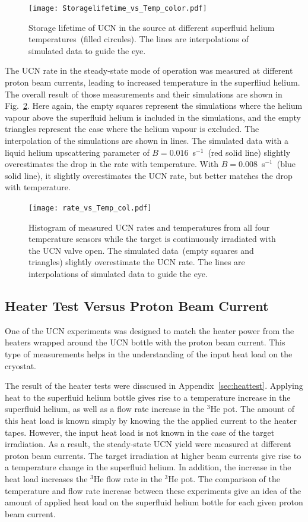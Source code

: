 \begin{figure}[h!]
  \centering
  \texttt{[image: Storagelifetime\_vs\_Temp\_color.pdf]}
  \caption{Storage lifetime of UCN in the source at different
    superfluid helium temperatures~(filled circules). The lines are
    interpolations of simulated data to guide the eye.}
  \label{fig:storage_vs_temp_sim}
\end{figure}

The UCN rate in the steady-state mode of operation was measured at
different proton beam currents, leading to increased temperature in
the superfliud helium. The overall result of those measurements and
their simulations are shown in Fig.~\ref{fig:rate_vs_temp_sim}. Here
again, the empty squares represent the simulations where the helium
vapour above the superfluid helium is included in the simulations, and
the empty triangles represent the case where the helium vapour is
excluded. The interpolation of the simulations are shown in lines. The
simulated data with a liquid helium upscattering parameter of
$B= 0.016$~s$^{-1}$~(red solid line) slightly overestimates the drop
in the rate with temperature. With $B= 0.008$~s$^{-1}$~(blue solid
line), it slightly overestimates the UCN rate, but better matches the
drop with temperature.


\begin{figure}[h!]
  \centering
  \texttt{[image: rate\_vs\_Temp\_col.pdf]}
  \caption{Histogram of measured UCN rates and temperatures from all
    four temperature sensors while the target is continuously
    irradiated with the UCN valve open. The simulated data~(empty
    squares and triangles) slightly overestimate the UCN rate. The
    lines are interpolations of simulated data to guide the eye.}
  \label{fig:rate_vs_temp_sim}
\end{figure}


\subsection{Heater Test Versus Proton Beam Current}
One of the UCN experiments was designed to match the heater power from
the heaters wrapped around the UCN bottle with the proton beam
current. This type of measurements helps in the understanding of the
input heat load on the cryostat.

The result of the heater tests were disscused in
Appendix~\ref{sec:heattest}. Applying heat to the superfluid helium
bottle gives rise to a temperature increase in the superfluid helium,
as well as a flow rate increase in the $^3$He pot. The amount of this
heat load is known simply by knowing the the applied current to the
heater tapes. However, the input heat load is not known in the case of
the target irradiation. As a result, the steady-state UCN yield were
measured at different proton beam currents. The target irradiation at
higher beam currents give rise to a temperature change in the
superfluid helium. In addition, the increase in the heat load
increases the $^3$He flow rate in the $^3$He pot.  The comparison of
the temperature and flow rate increase between these experiments give
an idea of the amount of applied heat load on the superfluid helium
bottle for each given proton beam current.

